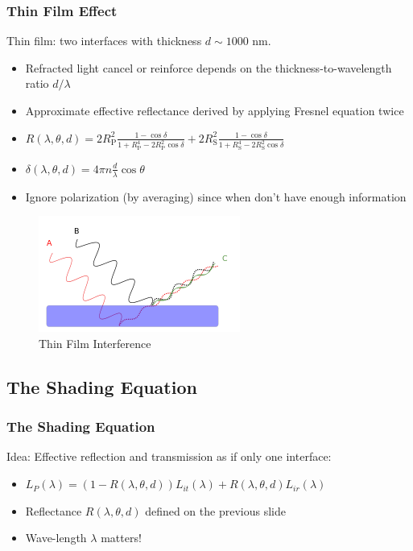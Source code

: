 \documentclass{beamer}
\begin{document}

\begin{frame}
	\frametitle{Thin Film Effect}
	Thin film: two interfaces with thickness $d \sim 1000$ nm.
	\begin{itemize}
		\item Refracted light cancel or reinforce depends on the thickness-to-wavelength ratio $d/\lambda$
		\item Approximate effective reflectance derived by applying Fresnel equation twice
		\item $	R(\lambda, \theta, d) = 2R_{\textrm{P}}^2\frac{1-\cos\delta}{1+R_{\textrm{P}}^4-2R_{\textrm{P}}^2\cos\delta}+2R_{\textrm{S}}^2\frac{1-\cos\delta}{1+R_{\textrm{S}}^4-2R_{\textrm{S}}^2\cos\delta}$
		\item $ \delta(\lambda, \theta, d) = 4\pi n\frac{d}{\lambda}\cos\theta $
		\item Ignore polarization (by averaging) since when don't have enough information
	\end{itemize}
	\begin{figure}
	\centering
	\includegraphics[width=0.3\linewidth]{thin_film_theory.png}
	\caption{Thin Film Interference}
	\end{figure}
\end{frame}


\subsection{The Shading Equation}

\begin{frame}
	\frametitle{The Shading Equation}
	Idea: Effective reflection and transmission as if only one interface:
	\begin{itemize}
		\item $	L_P(\lambda) = (1-R(\lambda, \theta, d))L_{it}(\lambda) + R(\lambda, \theta, d)L_{ir}(\lambda) $
		\item Reflectance $R(\lambda, \theta, d)$ defined on the previous slide
		\item Wave-length $\lambda$ matters!
	\end{itemize}
\end{frame}
\end{document}
